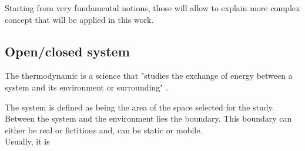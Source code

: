 \documentclass[12pt,a4paper]{report}
\begin{document}
Starting from very fundamental notions, those will allow to explain more complex concept that will be applied in this work.

\subsection{Open/closed system}
The thermodynamic is a science that "studies the exchange of energy between a system and its environment or surrounding" \cite{thermoApp_1}.

The system is defined as being the area of the space selected for the study. Between the system and the environment lies the boundary. This boundary can either be real or fictitious and, can be static or mobile.\\

Usually, it is 




\end{document}
